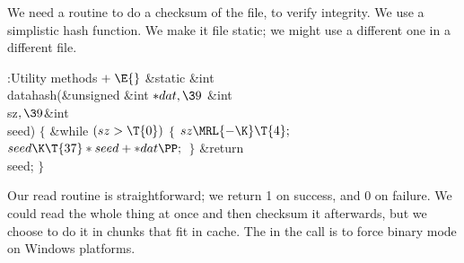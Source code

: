 We need a routine to do a checksum of the file, to verify integrity.
We use a simplistic hash function.  We make it file static; we might
use a different one in a different file.

\Y\B\4:Utility methods\X${}\mathrel+\E{}$\6
\&{static} \&{int} \\{datahash}(\&{unsigned} \&{int} ${}{*}\\{dat},\39{}$%
\&{int} \\{sz}${},\39{}$\&{int} \\{seed})\1\1\2\2\6
${}\{{}$\1\6
\&{while} ${}(\\{sz}>\T{0}){}$\5
${}\{{}$\1\6
${}\\{sz}\MRL{-{\K}}\T{4};{}$\6
${}\\{seed}\K\T{37}*\\{seed}+{*}\\{dat}\PP;{}$\6
\4${}\}{}$\2\6
\&{return} \\{seed};\6
\4${}\}{}$\2\par
\fi

Our read routine is straightforward; we return 1 on success, and
0 on failure.  We could read the whole thing at once and then checksum
it afterwards, but we choose to do it in chunks that fit in cache.
The  in the  call is to force binary mode on Windows
platforms.


